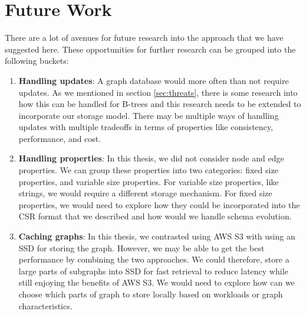 \section{Future Work}\label{sec:futureWork}
There are a lot of avenues for future research into the approach that we have
suggested here. These opportunities for further research can be grouped into the
following buckets:
\begin{enumerate}
    \item \textbf{Handling updates}: A graph database would more often than not
        require updates. As we mentioned in section \ref{sec:threats}, there is
        some research into how this can be handled for B-trees and this research
        needs to be extended to incorporate our storage model. There may be
        multiple ways of handling updates with multiple tradeoffs in terms of
        properties like consistency, performance, and cost.
    \item \textbf{Handling properties}: In this thesis, we did not consider node
        and edge properties. We can group these properties into two categories:
        fixed size properties, and variable size properties. For variable size
        properties, like strings, we would require a different storage
        mechanism. For fixed size properties, we would need to explore how they
        could be incorporated into the CSR format that we described and how
        would we handle schema evolution.
    \item \textbf{Caching graphs}: In this thesis, we contrasted using AWS S3
        with using an SSD for storing the graph. However, we may be able to get
        the best performance by combining the two approaches. We could
        therefore, store a large parts of subgraphs into SSD for fast retrieval
        to reduce latency while still enjoying the benefits of AWS S3. We would
        need to explore how can we choose which parts of graph to store locally
        based on workloads or graph characteristics.
\end{enumerate}
